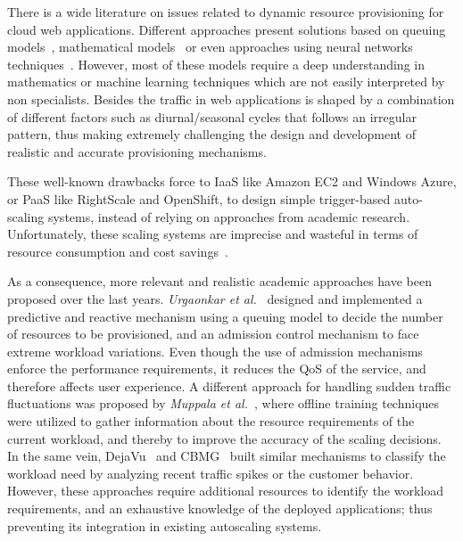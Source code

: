 
There is a wide literature on issues related to dynamic resource provisioning for cloud web applications. Different approaches present solutions based on queuing models~\cite{urgaonkar_agile_2008}, mathematical models~\cite{muppala_regression-based_2012} or even approaches using neural networks techniques~\cite{islam_empirical_2012}. However, most of these models require a deep understanding in mathematics or machine learning techniques which are not easily interpreted by non specialists. Besides the traffic in web applications is shaped by a combination of different factors such as diurnal/seasonal cycles that follows an irregular pattern, thus making extremely challenging the design and development of realistic and accurate provisioning mechanisms. 

These well-known drawbacks force to IaaS like Amazon EC2 and Windows Azure, or PaaS like RightScale and OpenShift,  to design simple trigger-based auto-scaling systems, instead of relying on approaches from academic research. Unfortunately, these scaling systems are imprecise and wasteful in terms of resource consumption and cost savings~\cite{ghanbari_exploring_2011}. %

As a consequence, more relevant and realistic academic approaches have been proposed over the last years. \emph{Urgaonkar et al.}~\cite{urgaonkar_agile_2008} designed and implemented a predictive and reactive mechanism using a queuing model to decide the number of resources to be provisioned, and an admission control mechanism to face extreme workload variations. 
Even though the use of admission mechanisms enforce the performance requirements, it reduces the QoS of the service, and therefore affects user experience. A different approach for handling sudden traffic fluctuations was proposed by \emph{Muppala et al.}~\cite{muppala_regression-based_2012}, where offline training techniques were utilized to gather information about the resource requirements of the current workload, and thereby to improve the accuracy of the scaling decisions. In the same vein, DejaVu~\cite{vasic_dejavu_2012} and CBMG~\cite{roy_efficient_2011} built similar mechanisms to classify the workload need by analyzing recent traffic spikes or the customer behavior. However, these approaches require additional resources to identify the workload requirements, and an exhaustive knowledge of the deployed applications; thus preventing its integration in existing autoscaling systems.


